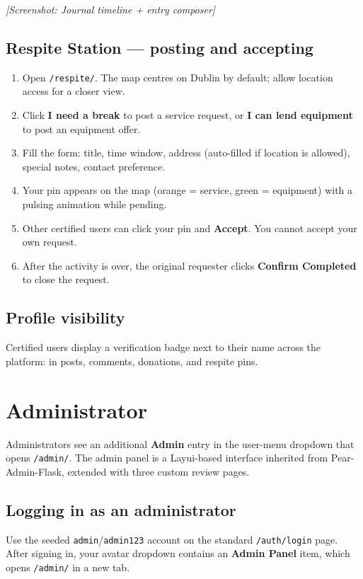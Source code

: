\textit{[Screenshot: Journal timeline + entry composer]}

\subsection{Respite Station — posting and accepting}
\begin{enumerate}
  \item Open \texttt{/respite/}. The map centres on Dublin by default;
        allow location access for a closer view.
  \item Click \textbf{I need a break} to post a service request, or
        \textbf{I can lend equipment} to post an equipment offer.
  \item Fill the form: title, time window, address (auto-filled if
        location is allowed), special notes, contact preference.
  \item Your pin appears on the map (orange = service, green =
        equipment) with a pulsing animation while pending.
  \item Other certified users can click your pin and \textbf{Accept}.
        You cannot accept your own request.
  \item After the activity is over, the original requester clicks
        \textbf{Confirm Completed} to close the request.
\end{enumerate}

\subsection{Profile visibility}
Certified users display a verification badge next to their name across
the platform: in posts, comments, donations, and respite pins.

\section{Administrator}

Administrators see an additional \textbf{Admin} entry in the user-menu
dropdown that opens \texttt{/admin/}. The admin panel is a Layui-based
interface inherited from Pear-Admin-Flask, extended with three custom
review pages.

\subsection{Logging in as an administrator}
Use the seeded \texttt{admin}/\texttt{admin123} account on the standard
\texttt{/auth/login} page. After signing in, your avatar dropdown
contains an \textbf{Admin Panel} item, which opens \texttt{/admin/} in a
new tab.

